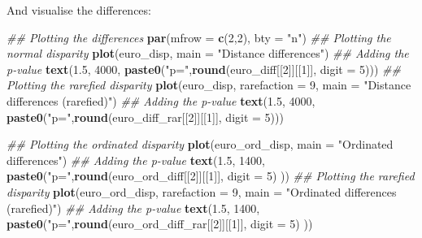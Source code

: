 \documentclass[
]{book}
\newenvironment{Shaded}{\begin{snugshade}}{\end{snugshade}}
\newcommand{\CommentTok}[1]{\textcolor[rgb]{0.56,0.35,0.01}{\textit{#1}}}
\newcommand{\DataTypeTok}[1]{\textcolor[rgb]{0.13,0.29,0.53}{#1}}
\newcommand{\DecValTok}[1]{\textcolor[rgb]{0.00,0.00,0.81}{#1}}
\newcommand{\FloatTok}[1]{\textcolor[rgb]{0.00,0.00,0.81}{#1}}
\newcommand{\KeywordTok}[1]{\textcolor[rgb]{0.13,0.29,0.53}{\textbf{#1}}}
\newcommand{\NormalTok}[1]{#1}
\newcommand{\StringTok}[1]{\textcolor[rgb]{0.31,0.60,0.02}{#1}}
\begin{document}
And visualise the differences:

\begin{Shaded}
\begin{Highlighting}[]
\CommentTok{\#\# Plotting the differences}
\KeywordTok{par}\NormalTok{(}\DataTypeTok{mfrow =} \KeywordTok{c}\NormalTok{(}\DecValTok{2}\NormalTok{,}\DecValTok{2}\NormalTok{), }\DataTypeTok{bty =} \StringTok{"n"}\NormalTok{)}
\CommentTok{\#\# Plotting the normal disparity}
\KeywordTok{plot}\NormalTok{(euro\_disp, }\DataTypeTok{main =} \StringTok{"Distance differences"}\NormalTok{)}
\CommentTok{\#\# Adding the p{-}value}
\KeywordTok{text}\NormalTok{(}\FloatTok{1.5}\NormalTok{, }\DecValTok{4000}\NormalTok{, }\KeywordTok{paste0}\NormalTok{(}\StringTok{"p="}\NormalTok{,}\KeywordTok{round}\NormalTok{(euro\_diff[[}\DecValTok{2}\NormalTok{]][[}\DecValTok{1}\NormalTok{]], }\DataTypeTok{digit =} \DecValTok{5}\NormalTok{)))}
\CommentTok{\#\# Plotting the rarefied disparity}
\KeywordTok{plot}\NormalTok{(euro\_disp, }\DataTypeTok{rarefaction =} \DecValTok{9}\NormalTok{, }\DataTypeTok{main =} \StringTok{"Distance differences (rarefied)"}\NormalTok{)}
\CommentTok{\#\# Adding the p{-}value}
\KeywordTok{text}\NormalTok{(}\FloatTok{1.5}\NormalTok{, }\DecValTok{4000}\NormalTok{, }\KeywordTok{paste0}\NormalTok{(}\StringTok{"p="}\NormalTok{,}\KeywordTok{round}\NormalTok{(euro\_diff\_rar[[}\DecValTok{2}\NormalTok{]][[}\DecValTok{1}\NormalTok{]], }\DataTypeTok{digit =} \DecValTok{5}\NormalTok{)))}

\CommentTok{\#\# Plotting the ordinated disparity}
\KeywordTok{plot}\NormalTok{(euro\_ord\_disp, }\DataTypeTok{main =} \StringTok{"Ordinated differences"}\NormalTok{)}
\CommentTok{\#\# Adding the p{-}value}
\KeywordTok{text}\NormalTok{(}\FloatTok{1.5}\NormalTok{, }\DecValTok{1400}\NormalTok{, }\KeywordTok{paste0}\NormalTok{(}\StringTok{"p="}\NormalTok{,}\KeywordTok{round}\NormalTok{(euro\_ord\_diff[[}\DecValTok{2}\NormalTok{]][[}\DecValTok{1}\NormalTok{]], }\DataTypeTok{digit =} \DecValTok{5}\NormalTok{) ))}
\CommentTok{\#\# Plotting the rarefied disparity}
\KeywordTok{plot}\NormalTok{(euro\_ord\_disp, }\DataTypeTok{rarefaction =} \DecValTok{9}\NormalTok{, }\DataTypeTok{main =} \StringTok{"Ordinated differences (rarefied)"}\NormalTok{)}
\CommentTok{\#\# Adding the p{-}value}
\KeywordTok{text}\NormalTok{(}\FloatTok{1.5}\NormalTok{, }\DecValTok{1400}\NormalTok{, }\KeywordTok{paste0}\NormalTok{(}\StringTok{"p="}\NormalTok{,}\KeywordTok{round}\NormalTok{(euro\_ord\_diff\_rar[[}\DecValTok{2}\NormalTok{]][[}\DecValTok{1}\NormalTok{]], }\DataTypeTok{digit =} \DecValTok{5}\NormalTok{) ))}
\end{Highlighting}
\end{Shaded}
\end{document}
